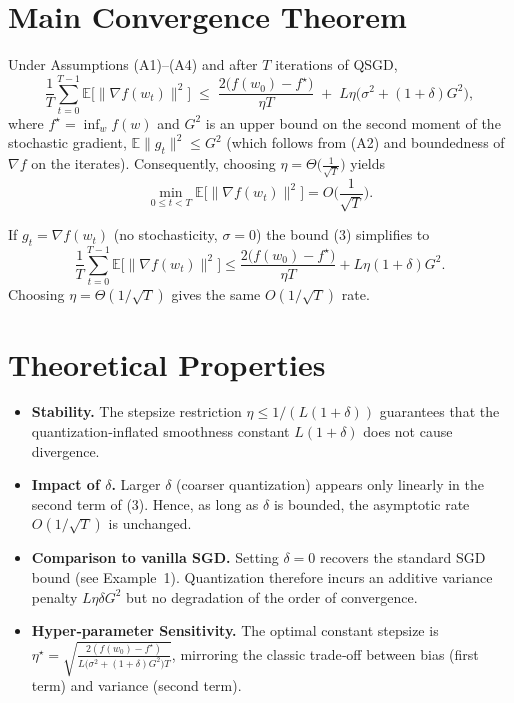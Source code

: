 \documentclass{article}
\begin{document}
\section*{Main Convergence Theorem}
\begin{theorem}\label{thm:main}
Under Assumptions (A1)–(A4) and after $T$ iterations of QSGD,
\[
\frac{1}{T}\sum_{t=0}^{T-1}\mathbb{E}\!\big[\|\nabla f(w_t)\|^2\big]
\;\le\;
\frac{2\big(f(w_0)-f^\star\big)}{\eta T}
\;+\;
L\eta\big(\sigma^2+(1+\delta)G^2\big),
\tag{3}
\]
where $f^\star=\inf_w f(w)$ and $G^2$ is an upper bound on the second moment
of the stochastic gradient,
$\mathbb{E}\|g_t\|^2\le G^2$ (which follows from (A2) and boundedness of
$\nabla f$ on the iterates).  Consequently, choosing
$\eta = \Theta\!\big(\frac{1}{\sqrt{T}}\big)$ yields
\[
\min_{0\le t<T}\mathbb{E}\!\big[\|\nabla f(w_t)\|^2\big]
=O\!\Big(\frac{1}{\sqrt{T}}\Big).
\]
\end{theorem}

\begin{theorem}\label{thm:det}
If $g_t=\nabla f(w_t)$ (no stochasticity, $\sigma=0$) the bound (3) simplifies to
\[
\frac{1}{T}\sum_{t=0}^{T-1}\mathbb{E}\!\big[\|\nabla f(w_t)\|^2\big]
\le
\frac{2\big(f(w_0)-f^\star\big)}{\eta T}
+L\eta(1+\delta)G^2.
\]
Choosing $\eta = \Theta(1/\sqrt{T})$ gives the same $O(1/\sqrt{T})$ rate.
\end{theorem}

\section*{Theoretical Properties}
\begin{itemize}
\item \textbf{Stability.} The stepsize restriction $\eta\le 1/(L(1+\delta))$
guarantees that the quantization‑inflated smoothness constant $L(1+\delta)$
does not cause divergence.
\item \textbf{Impact of $\delta$.} Larger $\delta$ (coarser quantization) appears
only linearly in the second term of (3).  Hence, as long as $\delta$ is bounded,
the asymptotic rate $O(1/\sqrt{T})$ is unchanged.
\item \textbf{Comparison to vanilla SGD.} Setting $\delta=0$ recovers the
standard SGD bound (see Example~1).  Quantization therefore incurs an
additive variance penalty $L\eta\delta G^2$ but no degradation of the order of
convergence.
\item \textbf{Hyper‑parameter Sensitivity.} The optimal constant stepsize is
$\eta^\star=\sqrt{\frac{2(f(w_0)-f^\star)}{L\big(\sigma^2+(1+\delta)G^2\big)T}}$,
mirroring the classic trade‑off between bias (first term) and variance
(second term).
\end{itemize}
\end{document}
